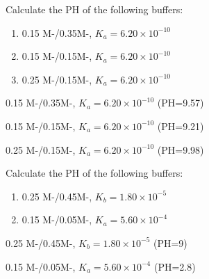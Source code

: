 \documentclass[main.tex]{subfiles}
\begin{document}
\begin{multicols*}{2}
\begin{question}[ID=\the\value{numA}]
Calculate the PH of the following buffers:
\begin{enumerate}[label=(\alph*)]
\item 0.15 M-/0.35M-, $K_a=6.20 \times 10^{-10}$ %
\item 0.15 M-/0.15M-, $K_a=6.20 \times 10^{-10}$ %
 \item 0.25 M-/0.15M-, $K_a=6.20 \times 10^{-10}$ %
 \end{enumerate}
\end{question}
\begin{solution}
\begin{inparaenum}[(a)]
\item 0.15 M-/0.35M-, $K_a=6.20 \times 10^{-10}$   (PH=9.57)
\item 0.15 M-/0.15M-, $K_a=6.20 \times 10^{-10}$   (PH=9.21)
 \item 0.25 M-/0.15M-, $K_a=6.20 \times 10^{-10}$   (PH=9.98)
 \end{inparaenum}
\hspace{0.1cm}\end{solution}%

\begin{question}[ID=\the\value{numA}]
Calculate the PH of the following buffers:
\begin{enumerate}[label=(\alph*)]
\item 0.25 M-/0.45M-, $K_b=1.80 \times 10^{-5}$ %
\item 0.15 M-/0.05M-, $K_a=5.60 \times 10^{-4}$ %
 \end{enumerate}
\end{question}
\begin{solution}
\begin{inparaenum}[(a)]
\item 0.25 M-/0.45M-, $K_b=1.80 \times 10^{-5}$  (PH=9)
\item 0.15 M-/0.05M-, $K_a=5.60 \times 10^{-4}$   (PH=2.8)
 \end{inparaenum}
\hspace{0.1cm}\end{solution}%


\end{multicols*}
\end{document}
